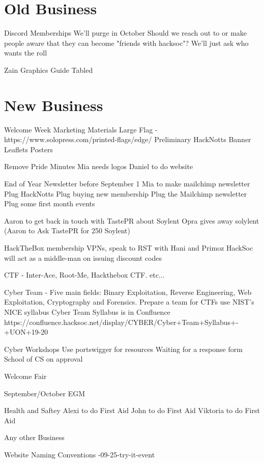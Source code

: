 \documentclass[11pt,hacksoc]{meetingmins}
\begin{document}
\section{Old Business}
\begin{items}
	\item Discord Memberships
		\subitem We'll purge in October
		\subitem Should we reach out to or make people aware that they can become "friends with hacksoc"?
		\subitem We'll just ask who wants the roll
	\item Zain Graphics Guide
		\subitem Tabled
\end{items}

\section{New Business}
\begin{items}
	\item Welcome Week Marketing Materials
		\subitem Large Flag - https://www.solopress.com/printed-flags/edge/
		\subitem Preliminary HackNotts Banner
		\subitem Leaflets
		\subitem Posters
	\item Remove Pride Minutes
		\subitem Mia needs logos
		\subitem Daniel to do website
	\item End of Year Newsletter before September 1 
		\subitem Mia to make mailchimp newsletter
		\subitem Plug HackNotts
		\subitem Plug buying new membership
		\subitem Plug the Mailchimp newsletter
		\subitem Plug some first month events
	\item Aaron to get back in touch with TastePR about Soylent
		\subitem Opra gives away solylent (Aaron to Ask TastePR for 250 Soylent)
	\item HackTheBox membership
		\subitem VPNs, speak to RST with Hani and Primoz
		\subitem HackSoc will act as a middle-man on issuing discount codes
	\item CTF - Inter-Ace, Root-Me, Hackthebox CTF. etc...
	\item Cyber Team -  Five main fields: Binary Exploitation, Reverse Engineering, Web Exploitation, Cryptography and Forensics.
		\subitem Prepare a team for CTFs
		\subitem use NIST's NICE syllabus 
		\subitem Cyber Team Syllabus is in Confluence https://confluence.hacksoc.net/display/CYBER/Cyber+Team+Syllabus+-+UON+19-20
	\item Cyber Workshops
		\subitem Use portswigger for resources
		\subitem Waiting for a response form School of CS on approval
	\item Welcome Fair
	\item September/October EGM
	\item Health and Saftey
		\subitem Alexi to do First Aid
		\subitem John to do First Aid
		\subitem Viktoria to do First Aid
	\item Any other Business
	\item Website Naming Conventions
		-09-25-try-it-event
		\subitem {}
\end{items}

\vspace{1em}
\nextmeeting{}
\end{document}
